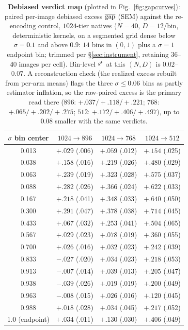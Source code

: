 \begin{table}[h]
\caption{\textbf{Debiased verdict map} (plotted in
Fig.~\ref{fig:gapcurves}): paired per-image debiased excess
$\overline{\mathrm{gap}}$ (SEM) against the re-encoding control, $1024$-tier natives
($N{=}40$, $D{=}12$/bin, deterministic kernels, on a segmented grid
dense below $\sigma = 0.1$ and above $0.9$: $14$ bins in $(0, 1)$ plus
a $\sigma{=}1$ endpoint bin; trimmed per \S\ref{sec:instrument},
retaining $36$--$40$ images per cell). Bin-level $\varepsilon^{\!*}$ at this
$(N, D)$ is $0.02$--$0.07$. A reconstruction check (the realized
excess rebuilt from per-arm means) flags the three $\sigma \le 0.06$
bins as partly estimator inflation, so the raw-paired excess is the
primary read there ($896$: $+.037/+.118/+.221$; $768$:
$+.065/+.202/+.275$; $512$: $+.172/+.406/+.497$), up to $0.08$
smaller with the same verdicts.}
\label{tab:debiasedmap}
\centering
\small
\begin{tabular}{cccc}
\toprule
$\sigma$ bin center & $1024{\to}896$ & $1024{\to}768$ & $1024{\to}512$ \\
\midrule
0.013 & $+.029$ {\scriptsize(.006)} & $+.059$ {\scriptsize(.012)} & $+.154$ {\scriptsize(.025)} \\
0.038 & $+.158$ {\scriptsize(.016)} & $+.219$ {\scriptsize(.026)} & $+.480$ {\scriptsize(.029)} \\
0.063 & $+.239$ {\scriptsize(.019)} & $+.323$ {\scriptsize(.028)} & $+.575$ {\scriptsize(.037)} \\
0.088 & $+.282$ {\scriptsize(.026)} & $+.366$ {\scriptsize(.024)} & $+.622$ {\scriptsize(.033)} \\
0.167 & $+.218$ {\scriptsize(.041)} & $+.348$ {\scriptsize(.033)} & $+.640$ {\scriptsize(.050)} \\
0.300 & $+.291$ {\scriptsize(.047)} & $+.378$ {\scriptsize(.038)} & $+.714$ {\scriptsize(.045)} \\
0.433 & $+.067$ {\scriptsize(.032)} & $+.253$ {\scriptsize(.041)} & $+.504$ {\scriptsize(.065)} \\
0.567 & $+.029$ {\scriptsize(.023)} & $+.078$ {\scriptsize(.019)} & $+.360$ {\scriptsize(.055)} \\
0.700 & $+.026$ {\scriptsize(.016)} & $+.032$ {\scriptsize(.023)} & $+.242$ {\scriptsize(.039)} \\
0.833 & $-.027$ {\scriptsize(.020)} & $+.034$ {\scriptsize(.023)} & $+.218$ {\scriptsize(.053)} \\
0.913 & $-.007$ {\scriptsize(.014)} & $+.039$ {\scriptsize(.013)} & $+.205$ {\scriptsize(.047)} \\
0.938 & $-.039$ {\scriptsize(.026)} & $+.019$ {\scriptsize(.019)} & $+.200$ {\scriptsize(.049)} \\
0.963 & $-.008$ {\scriptsize(.015)} & $+.026$ {\scriptsize(.016)} & $+.120$ {\scriptsize(.045)} \\
0.988 & $+.018$ {\scriptsize(.028)} & $+.034$ {\scriptsize(.045)} & $+.217$ {\scriptsize(.052)} \\
\midrule
1.0 (endpoint) & $+.034$ {\scriptsize(.011)} & $+.130$ {\scriptsize(.030)} & $+.406$ {\scriptsize(.049)} \\
\bottomrule
\end{tabular}
\end{table}

